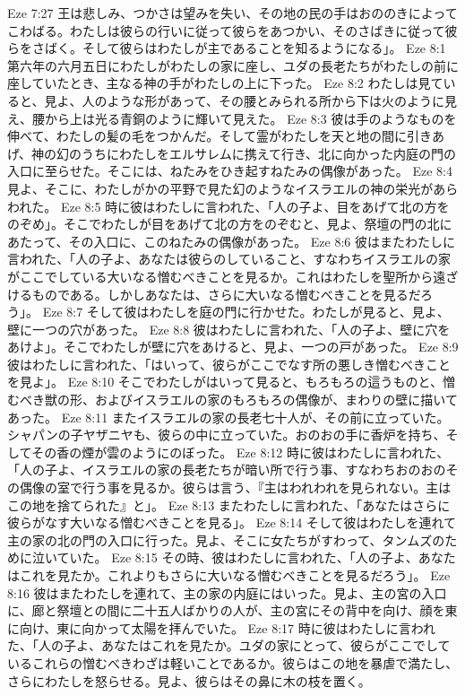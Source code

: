 Eze 7:27  王は悲しみ、つかさは望みを失い、その地の民の手はおののきによってこわばる。わたしは彼らの行いに従って彼らをあつかい、そのさばきに従って彼らをさばく。そして彼らはわたしが主であることを知るようになる」。
Eze 8:1  第六年の六月五日にわたしがわたしの家に座し、ユダの長老たちがわたしの前に座していたとき、主なる神の手がわたしの上に下った。
Eze 8:2  わたしは見ていると、見よ、人のような形があって、その腰とみられる所から下は火のように見え、腰から上は光る青銅のように輝いて見えた。
Eze 8:3  彼は手のようなものを伸べて、わたしの髪の毛をつかんだ。そして霊がわたしを天と地の間に引きあげ、神の幻のうちにわたしをエルサレムに携えて行き、北に向かった内庭の門の入口に至らせた。そこには、ねたみをひき起すねたみの偶像があった。
Eze 8:4  見よ、そこに、わたしがかの平野で見た幻のようなイスラエルの神の栄光があらわれた。
Eze 8:5  時に彼はわたしに言われた、「人の子よ、目をあげて北の方をのぞめ」。そこでわたしが目をあげて北の方をのぞむと、見よ、祭壇の門の北にあたって、その入口に、このねたみの偶像があった。
Eze 8:6  彼はまたわたしに言われた、「人の子よ、あなたは彼らのしていること、すなわちイスラエルの家がここでしている大いなる憎むべきことを見るか。これはわたしを聖所から遠ざけるものである。しかしあなたは、さらに大いなる憎むべきことを見るだろう」。
Eze 8:7  そして彼はわたしを庭の門に行かせた。わたしが見ると、見よ、壁に一つの穴があった。
Eze 8:8  彼はわたしに言われた、「人の子よ、壁に穴をあけよ」。そこでわたしが壁に穴をあけると、見よ、一つの戸があった。
Eze 8:9  彼はわたしに言われた、「はいって、彼らがここでなす所の悪しき憎むべきことを見よ」。
Eze 8:10  そこでわたしがはいって見ると、もろもろの這うものと、憎むべき獣の形、およびイスラエルの家のもろもろの偶像が、まわりの壁に描いてあった。
Eze 8:11  またイスラエルの家の長老七十人が、その前に立っていた。シャパンの子ヤザニヤも、彼らの中に立っていた。おのおの手に香炉を持ち、そしてその香の煙が雲のようにのぼった。
Eze 8:12  時に彼はわたしに言われた、「人の子よ、イスラエルの家の長老たちが暗い所で行う事、すなわちおのおのその偶像の室で行う事を見るか。彼らは言う、『主はわれわれを見られない。主はこの地を捨てられた』と」。
Eze 8:13  またわたしに言われた、「あなたはさらに彼らがなす大いなる憎むべきことを見る」。
Eze 8:14  そして彼はわたしを連れて主の家の北の門の入口に行った。見よ、そこに女たちがすわって、タンムズのために泣いていた。
Eze 8:15  その時、彼はわたしに言われた、「人の子よ、あなたはこれを見たか。これよりもさらに大いなる憎むべきことを見るだろう」。
Eze 8:16  彼はまたわたしを連れて、主の家の内庭にはいった。見よ、主の宮の入口に、廊と祭壇との間に二十五人ばかりの人が、主の宮にその背中を向け、顔を東に向け、東に向かって太陽を拝んでいた。
Eze 8:17  時に彼はわたしに言われた、「人の子よ、あなたはこれを見たか。ユダの家にとって、彼らがここでしているこれらの憎むべきわざは軽いことであるか。彼らはこの地を暴虐で満たし、さらにわたしを怒らせる。見よ、彼らはその鼻に木の枝を置く。
